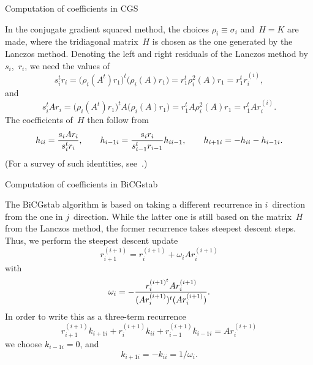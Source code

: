  {Computation of coefficients in CGS}

In the conjugate gradient squared method, the choices $\rho_i\equiv
\sigma_i$ and~$H=K$ are made, where the tridiagonal matrix~$H$ is
chosen as the one generated by the Lanczos method. Denoting the left
and right residuals of the
Lanczos method by~$s_i$,~$r_i$, we need  the values of
	\begin{equation} s_i^tr_i=
		\bigl(\rho_i(A^t)r_1\bigr)^t\bigl(\rho_i(A)r_1\bigr)=
		r_1^t\rho_i^2(A)r_1=r_1^tr_i^{(i)}, 
	\label{eq:lanczos-rr}\end{equation}
and	\begin{equation} s_i^tAr_i=
		\bigl(\rho_i(A^t)r_1\bigr)^tA\bigl(\rho_i(A)r_1\bigr)=
		r_1^tA\rho_i^2(A)r_1=r_1^tAr_i^{(i)}.
	\label{eq:lanczos-rar}\end{equation}
The coefficients of~$H$ then follow from
	\begin{equation}
	h_{ii}={s_iAr_i\over s_i^tr_i},\qquad
	h_{i-1i}={s_{i}r_{i}\over s_{i-1}^tr_{i-1}}
		h_{ii-1},\qquad
	h_{i+1i}=-h_{ii}-h_{i-1i}.
	\label{eq:H-from-rr}\end{equation}
(For a survey of such identities, see~\cite{Eij:lawn51}.)

 {Computation of coefficients in BiCGstab}

The BiCGstab algorithm is based on taking a different recurrence in
$i$~direction from the one in $j$~direction. While the latter one is
still based on the matrix~$H$ from the Lanczos method, the former
recurrence takes steepest descent steps. Thus, we perform the
steepest descent update 
	\[ r_{i+1}^{(i+1)}=r_i^{(i+1)}+\omega_iAr_i^{(i+1)} \]
with 	\[ \omega_i=-{r_i^{(i+1)^t}Ar_i^{(i+1)} \over
		(Ar_i^{(i+1)})^t(Ar_i^{(i+1)}) }. \]
In order to write this as a three-term recurrence
	\[ r_{i+1}^{(i+1)}k_{i+1i}+r_{i}^{(i+1)}k_{ii}+r_{i-1}^{(i+1)}k_{i-1i}
		=Ar_{i}^{(i+1)} \]
we choose $k_{i-1i}=0$, and
	\[ k_{i+1i}=-k_{ii}=1/\omega_i. \]

